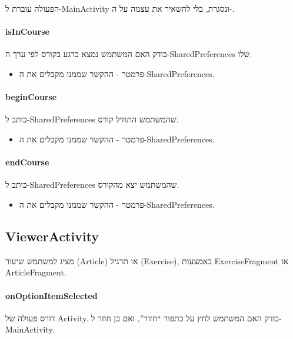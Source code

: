 הפעולה עוברת ל-MainActivity ונסגרת, בלי להשאיר את עצמה על ה-.

\paragraph{isInCourse}

בודק האם המשתמש נמצא כרגע בקורס לפי ערך ה-SharedPreferences שלו.

\begin{itemize}
  \item פרמטר  - ההקשר שממנו מקבלים את ה-SharedPreferences.
\end{itemize}

\paragraph{beginCourse}

כותב ל-SharedPreferences שהמשתמש התחיל קורס.

\begin{itemize}
  \item פרמטר  - ההקשר שממנו מקבלים את ה-SharedPreferences.
\end{itemize}

\paragraph{endCourse}

כותב ל-SharedPreferences שהמשתמש יצא מהקורס.

\begin{itemize}
  \item פרמטר  - ההקשר שממנו מקבלים את ה-SharedPreferences.
\end{itemize}

\subsection*{ViewerActivity}

מציג למשתמש שיעור (Article) או תרגיל (Exercise), באמצעות ExerciseFragment או ArticleFragment.

\paragraph{onOptionItemSelected}

דורס פעולה של Activity.
בודק האם המשתמש לחץ על כתפור ``חזור'', ואם כן חוזר ל-MainActivity.

